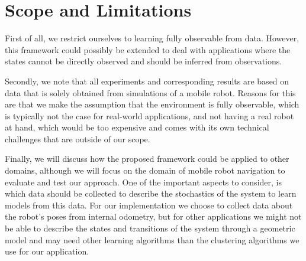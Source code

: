 

\section{Scope and Limitations}
\label{sec:scope-limitations}

First of all, we restrict ourselves to learning fully observable  from data.
However, this framework could possibly be extended to deal with applications where the states cannot be directly observed and should be inferred from observations.

Secondly, we note that all experiments and corresponding results are based on data that is solely obtained from simulations of a mobile robot.
Reasons for this are that we make the assumption that the environment is fully observable, which is typically not the case for real-world applications, and not having a real robot at hand, which would be too expensive and comes with its own technical challenges that are outside of our scope.

Finally, we will discuss how the proposed framework could be applied to other domains, although we will focus on the domain of mobile robot navigation to evaluate and test our approach.
One of the important aspects to consider, is which data should be collected to describe the stochastics of the system to learn models from this data.
For our implementation we choose to collect data about the robot's poses from internal odometry, but for other applications we might not be able to describe the states and transitions of the system through a geometric model and may need other learning algorithms than the clustering algorithms we use for our application.


